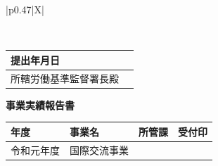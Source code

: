 \documentclass[UTF8,10pt,a4paper,fontset=fandol]{ctexart}
\begin{document}
\begin{tabularx}{\textwidth}{|p{0.47\textwidth}|X|}
\begin{minipage}[t]{\linewidth}
\vspace{1em}
\end{minipage}
\\
\hline
\end{tabularx}

\vspace{1em}

\begin{tabularx}{\textwidth}{|p{}|X|p{}|}
\hline
提出年月日 & \multicolumn{2}{l|}{\rule{0pt}{2.2ex}}\\
\hline
所轄労働基準監督署長殿 & \multicolumn{2}{l|}{\rule{0pt}{2.2ex}}\\
\hline
\end{tabularx}

\noindent

\newpage

\noindent
\begin{center}
\textbf{事業実績報告書}
\end{center}

\noindent
\begin{tabularx}{\textwidth}{|l|X|l|l|}
\hline
年度 & 事業名 & 所管課 & 受付印 \\
\hline
令和元年度 & 国際交流事業 &  &  \\
\hline
\end{tabularx}

\vspace{2mm}
\end{document}
